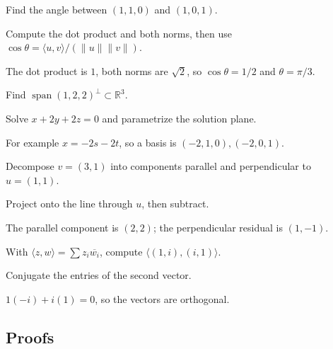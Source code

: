 \begin{exercise}[Angle]\label{exr:i13-expand-02}
Find the angle between \((1,1,0)\) and \((1,0,1)\).
\end{exercise}
\begin{hint}
Compute the dot product and both norms, then use \(\cos\theta=\langle u,v\rangle/(\|u\|\|v\|)\).
\end{hint}
\begin{solution}
The dot product is \(1\), both norms are \(\sqrt2\), so \(\cos\theta=1/2\) and \(\theta=\pi/3\).
\end{solution}

\begin{exercise}\label{exr:i13-expand-03}
Find \(\operatorname{span}(1,2,2)^\perp\subset\mathbb R^3\).
\end{exercise}
\begin{hint}
Solve \(x+2y+2z=0\) and parametrize the solution plane.
\end{hint}
\begin{solution}
For example \(x=-2s-2t\), so a basis is \((-2,1,0),(-2,0,1)\).
\end{solution}

\begin{exercise}\label{exr:i13-expand-04}
Decompose \(v=(3,1)\) into components parallel and perpendicular to \(u=(1,1)\).
\end{exercise}
\begin{hint}
Project onto the line through \(u\), then subtract.
\end{hint}
\begin{solution}
The parallel component is \((2,2)\); the perpendicular residual is \((1,-1)\).
\end{solution}

\begin{exercise}\label{exr:i13-expand-05}
With \(\langle z,w\rangle=\sum z_i\overline{w_i}\), compute \(\langle(1,i),(i,1)\rangle\).
\end{exercise}
\begin{hint}
Conjugate the entries of the second vector.
\end{hint}
\begin{solution}
\(1(-i)+i(1)=0\), so the vectors are orthogonal.
\end{solution}

\subsection*{Proofs}

